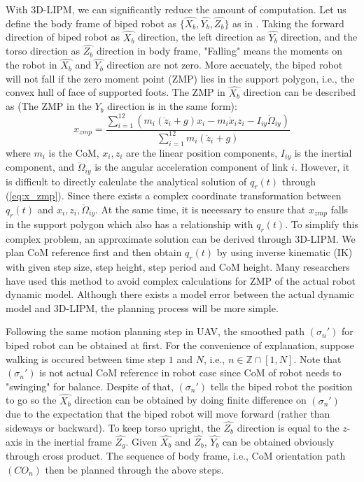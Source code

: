 \documentclass{ieeeaccess}
\begin{document}
With 3D-LIPM, we can significantly reduce the amount of computation. Let us define the body frame of biped robot as $\{ \widehat{X_b}, \widehat{Y_b}, \widehat{Z_b} \}$ as in \cite{ourrobot}. Taking the forward direction of biped robot as $\widehat{X_b}$ direction, the left direction as $\widehat{Y_b}$ direction, and the torso direction as $\widehat{Z_b}$ direction in body frame, "Falling" means the moments on the robot in $\widehat{X_b}$ and $\widehat{Y_b}$ direction are not zero. More accuately, the biped robot will not fall if the zero moment point (ZMP) lies in the support polygon, i.e., the convex hull of face of supported foots. The ZMP in $\widehat{X_b}$ direction can be described as \cite{huang2001planning} (The ZMP in the $\widehat{Y_b}$ direction is in the same form):
\begin{equation} \label{eq:x_zmp}
    x_{zmp} = \frac{\sum_{i=1}^{12} (m_i(\ddot{z}_i+g)x_i - m_i\ddot{x}_iz_i - I_{iy}\ddot{\Omega}_{iy})}
                   {\sum_{i=1}^{12} m_i(\ddot{z}_i+g)}
\end{equation}
where $m_i$ is the CoM, $x_i, z_i$ are the linear position components, $I_{iy}$ is the inertial component, and $\ddot{\Omega}_{iy}$ is the angular acceleration component of link $i$. However, it is difficult to directly calculate the analytical solution of $q_r(t)$ through (\ref{eq:x_zmp}). Since there exists a complex coordinate transformation between $q_r(t)$ and $x_i, z_i, \ddot{\Omega}_{iy}$. At the same time, it is necessary to ensure that $x_{zmp}$ falls in the support polygon which also has a relationship with $q_r(t)$. To simplify this complex problem, an approximate solution can be derived through 3D-LIPM. We plan CoM reference first and then obtain $q_r(t)$ by using inverse kinematic (IK) with given step size, step height, step period and CoM height. Many researchers have used this method to avoid complex calculations for ZMP of the actual robot dynamic model. Although there exists a model error between the actual dynamic model and 3D-LIPM, the planning process will be more simple.

Following the same motion planning step in UAV, the smoothed path $(\sigma_n')$ for biped robot can be obtained at first. For the convenience of explanation, suppose walking is occured between time step $1$ and $N$, i.e., $n\in\mathbb{Z}\cap[1,N]$. Note that $(\sigma_n')$ is not actual CoM reference in robot case since CoM of robot needs to "swinging" for balance. Despite of that, $(\sigma_n')$ tells the biped robot the position to go so the $\widehat{X_b}$ direction can be obtained by doing finite difference on $(\sigma_n')$ due to the expectation that the biped robot will move forward (rather than sideways or backward). To keep torso upright, the $\widehat{Z_b}$ direction is equal to the $z$-axis in the inertial frame $\widehat{Z_g}$. Given $\widehat{X_b}$ and $\widehat{Z_b}$, $\widehat{Y_b}$ can be obtained obviously through cross product. The sequence of body frame, i.e., CoM orientation path $(CO_n)$ then be planned through the above steps.
\end{document}
